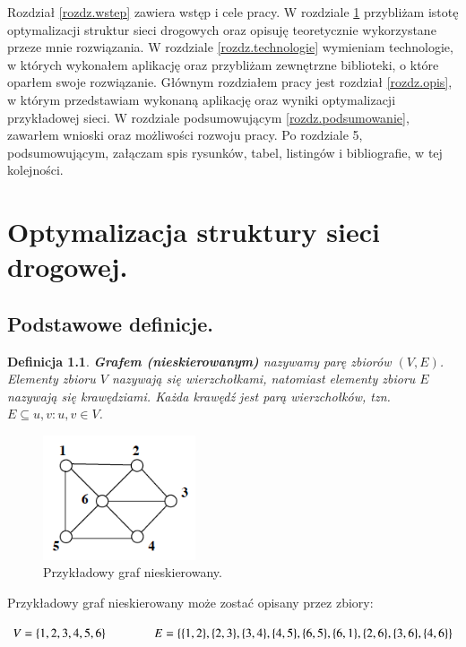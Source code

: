 \documentclass[twoside,12pt]{report}
\let\oldsection\chapter
\def\chapter{\cleardoublepage\oldsection}
\newtheorem{definition}{Definicja} %
\begin{document}
Rozdział \ref{rozdz.wstep} zawiera wstęp i cele pracy. W rozdziale \ref{rozdz.optymalizacja} przybliżam istotę optymalizacji struktur sieci drogowych
oraz opisuję teoretycznie wykorzystane przeze mnie rozwiązania. W rozdziale \ref{rozdz.technologie} wymieniam technologie, w których wykonałem aplikację oraz przybliżam zewnętrzne biblioteki, o które oparłem swoje rozwiązanie. Głównym rozdziałem pracy jest rozdział \ref{rozdz.opis},
w którym przedstawiam wykonaną aplikację oraz wyniki optymalizacji przykładowej sieci. W rozdziale podsumowującym \ref{rozdz.podsumowanie}, zawarłem wnioski oraz możliwości rozwoju pracy. Po rozdziale 5, podsumowującym, załączam spis rysunków, tabel, listingów i bibliografie, w tej kolejności.

\chapter{Optymalizacja struktury sieci drogowej.}\label{rozdz.optymalizacja} 
\section{Podstawowe definicje.}

\begin{definition}\label{Graf nieskierowany}
\textbf{Grafem (nieskierowanym)} nazywamy parę zbiorów $(V,E)$. Elementy zbioru $V$ nazywają się \textit{wierzchołkami}, natomiast elementy zbioru $E$ nazywają się \textit{krawędziami}. Każda krawędź jest parą wierzchołków, tzn. $E \subseteq {{u,v}:u,v \in V}$\cite{grafy}.
\end{definition}

\begin{figure}[ht]
\begin{center}
\includegraphics[width=0.40\textwidth]{img/graf1}
\caption{Przykładowy graf nieskierowany.} 
\end{center}
\end{figure}

Przykładowy graf nieskierowany może zostać opisany przez zbiory:
\begin{center}
\begin{math}
V=\{1,2,3,4,5,6\} \hspace*{40px} E=\{\{1,2\},\{2,3\},\{3,4\},\{4,5\},\{6,5\},\{6,1\},\{2,6\},\{3,6\},\{4,6\}\}
\end{math}
\end{center}
\end{document}
